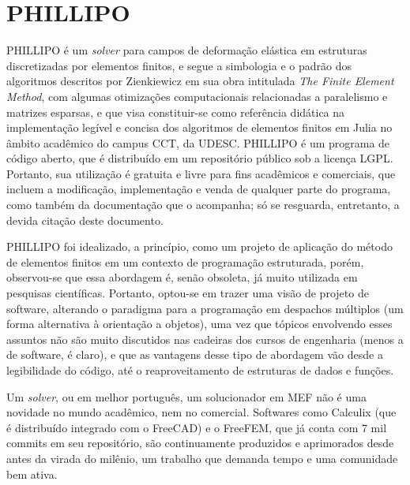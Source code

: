 

\chapter{PHILLIPO}

PHILLIPO é um \emph{solver} para campos de deformação elástica em estruturas discretizadas por elementos finitos, e segue a simbologia e o padrão dos algoritmos descritos por Zienkiewicz em sua obra intitulada \emph{The Finite Element Method}, com algumas otimizações computacionais relacionadas a paralelismo e matrizes esparsas, e que visa constituir-se como referência didática na implementação legível e concisa dos algoritmos de elementos finitos em Julia no âmbito acadêmico do campus CCT, da UDESC. PHILLIPO é um programa de código aberto, que é distribuído em um repositório público\footnotemark[1]{} sob a licença LGPL\footnotemark[2]{}. Portanto, sua utilização é gratuita e livre para fins acadêmicos e comerciais, que incluem a modificação, implementação e venda de qualquer parte do programa, como também da documentação que o acompanha; só se resguarda, entretanto, a devida citação deste documento.

PHILLIPO foi idealizado, a princípio, como um projeto de aplicação do método de elementos finitos em um contexto de programação estruturada, porém, observou-se que essa abordagem é, senão obsoleta, já muito utilizada em pesquisas científicas. Portanto, optou-se em trazer uma visão de projeto de software, alterando o paradigma para a programação em despachos múltiplos (um forma alternativa à orientação a objetos), uma vez que tópicos envolvendo esses assuntos não são muito discutidos nas cadeiras dos cursos de engenharia (menos a de software, é claro), e que as vantagens desse tipo de abordagem vão desde a legibilidade do código, até o reaproveitamento de estruturas de dados e funções.

Um \emph{solver}, ou em melhor português, um solucionador em MEF não é uma novidade no mundo acadêmico, nem no comercial. Softwares como Calculix (que é distribuído integrado com o FreeCAD) e o FreeFEM, que já conta com 7 mil commits em seu repositório, são continuamente produzidos e aprimorados desde antes da virada do milênio, um trabalho que demanda tempo e uma comunidade bem ativa.


